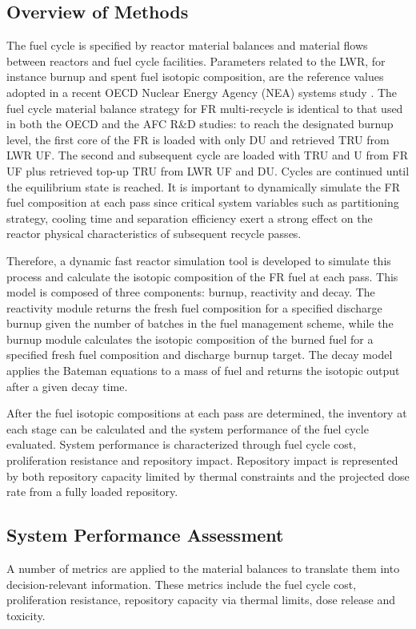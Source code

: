 \subsection{Overview of Methods}
\label{ses_sec:method_overview}
The fuel cycle is specified by reactor material balances and material
flows between reactors and fuel cycle facilities.  Parameters related to
the LWR, for instance burnup and spent fuel isotopic composition, are
the reference values adopted in a recent OECD Nuclear Energy Agency (NEA)
systems study \cite{NEA-5990}.  The fuel cycle material balance strategy for FR
multi-recycle is identical to that used in both the OECD and the AFC R\&D
studies: to reach the designated burnup level, the first core of the FR
is loaded with only DU and retrieved TRU from LWR UF. The second and
subsequent cycle are loaded with TRU and U from FR UF plus retrieved
top-up TRU from LWR UF and DU.  Cycles are continued
until the equilibrium state is reached.  It is important to dynamically
simulate the FR fuel composition at each pass since critical system
variables such as partitioning strategy, cooling time and separation
efficiency exert a strong effect on the reactor physical characteristics
of subsequent recycle passes. 

Therefore, a dynamic fast reactor simulation tool is developed to
simulate this process and calculate the isotopic composition of the FR
fuel at each pass.  This model is composed of three components: burnup,
reactivity and decay.  The reactivity module returns the fresh fuel
composition for a specified discharge burnup given the number of batches
in the fuel management scheme, while the burnup module calculates the
isotopic composition of the burned fuel for a specified fresh fuel
composition and discharge burnup target.  The decay model applies the
Bateman equations to a mass of fuel and returns the isotopic output
after a given decay time.  

After the fuel isotopic compositions at each pass are determined, the
inventory at each stage can be calculated and the system performance of
the fuel cycle evaluated.  System performance is characterized through
fuel cycle cost, proliferation resistance and repository impact. 
Repository impact is represented by both repository capacity limited by
thermal constraints and the projected dose rate from a fully loaded
repository.  



\subsection{System Performance Assessment}
\label{ses_sec:spa}
A number of metrics are applied to the material balances to translate
them into decision-relevant information.  These metrics include the fuel
cycle cost, proliferation resistance, repository capacity via thermal
limits, dose release and toxicity.

